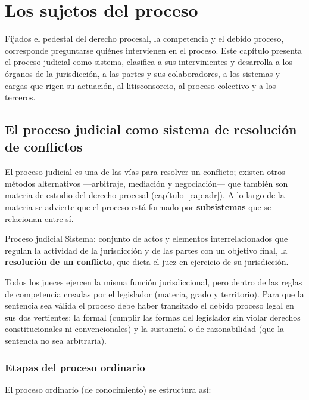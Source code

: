 \documentclass[12pt,oneside]{book}
\begin{document}
\chapter{Los sujetos del proceso}
\label{cap:sujetos}

Fijados el pedestal del derecho procesal, la competencia y el debido proceso, corresponde preguntarse quiénes intervienen en el proceso. Este capítulo presenta el proceso judicial como sistema, clasifica a sus intervinientes y desarrolla a los órganos de la jurisdicción, a las partes y sus colaboradores, a los sistemas y cargas que rigen su actuación, al litisconsorcio, al proceso colectivo y a los terceros.

\section{El proceso judicial como sistema de resolución de conflictos}

El proceso judicial es una de las vías para resolver un conflicto; existen otros métodos alternativos ---arbitraje, mediación y negociación--- que también son materia de estudio del derecho procesal (capítulo~\ref{cap:adr}). A lo largo de la materia se advierte que el proceso está formado por \textbf{subsistemas} que se relacionan entre sí.

\begin{definicion}{Proceso judicial}
Sistema: conjunto de actos y elementos interrelacionados que regulan la actividad de la jurisdicción y de las partes con un objetivo final, la \textbf{resolución de un conflicto}, que dicta el juez en ejercicio de su jurisdicción.
\end{definicion}

Todos los jueces ejercen la misma función jurisdiccional, pero dentro de las reglas de competencia creadas por el legislador (materia, grado y territorio). Para que la sentencia sea válida el proceso debe haber transitado el debido proceso legal en sus dos vertientes: la formal (cumplir las formas del legislador sin violar derechos constitucionales ni convencionales) y la sustancial o de razonabilidad (que la sentencia no sea arbitraria).

\subsection{Etapas del proceso ordinario}

El proceso ordinario (de conocimiento) se estructura así:
\end{document}
